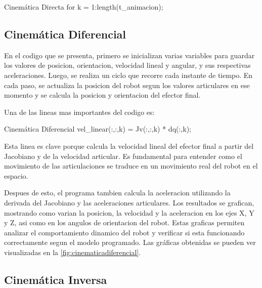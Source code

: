 \begin{matlabcode}{Cinemática Directa}
	for k = 1:length(t_animacion);
\end{matlabcode}


\subsection{Cinemática Diferencial}

En el codigo que se presenta, primero se inicializan varias variables para guardar los valores de posicion, orientacion, velocidad lineal y angular, y sus respectivas aceleraciones. Luego, se realiza un ciclo que recorre cada instante de tiempo. En cada paso, se actualiza la posicion del robot segun los valores articulares en ese momento y se calcula la posicion y orientacion del efector final.

Una de las lineas mas importantes del codigo es:
\begin{matlabcode}{Cinemática Diferencial}
	vel_linear(:,:,k) = Jv(:,:,k) * dq(:,k);
\end{matlabcode}

Esta linea es clave porque calcula la velocidad lineal del efector final a partir del Jacobiano y de la velocidad articular. Es fundamental para entender como el movimiento de las articulaciones se traduce en un movimiento real del robot en el espacio.

Despues de esto, el programa tambien calcula la aceleracion utilizando la derivada del Jacobiano y las aceleraciones articulares. Los resultados se grafican, mostrando como varian la posicion, la velocidad y la aceleracion en los ejes X, Y y Z, asi como en los angulos de orientacion del robot. Estas graficas permiten analizar el comportamiento dinamico del robot y verificar si esta funcionando correctamente segun el modelo programado. Las gráficas obtenidas se pueden ver visualizadas en la  \autoref{fig:cinematicadiferencial}.

\subsection{Cinemática Inversa}

